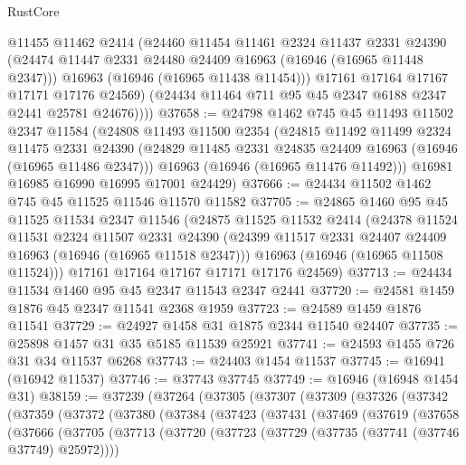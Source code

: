 \begin{lexlean}{RustCore}
\begin{coremodule}
            @11455
            @11462
            @2414
            (@24460
              @11454
              @11461
              @2324
              @11437
              @2331
              @24390
              (@24474 @11447 @2331 @24480 @24409 @16963 (@16946 (@16965 @11448 @2347)))
              @16963
              (@16946 (@16965 @11438 @11454)))
            @17161
            @17164
            @17167
            @17171
            @17176
            @24569)
          (@24434 @11464 @711 @95 @45 @2347 @6188 @2347 @2441 @25781 @24676))))
@37658 := @24798
    @1462
    @745
    @45
    @11493
    @11502
    @2347
    @11584
    (@24808
      @11493
      @11500
      @2354
      (@24815
        @11492
        @11499
        @2324
        @11475
        @2331
        @24390
        (@24829 @11485 @2331 @24835 @24409 @16963 (@16946 (@16965 @11486 @2347)))
        @16963
        (@16946 (@16965 @11476 @11492)))
      @16981
      @16985
      @16990
      @16995
      @17001
      @24429)
@37666 := @24434 @11502 @1462 @745 @45 @11525 @11546 @11570 @11582
@37705 := @24865
    @1460
    @95
    @45
    @11525
    @11534
    @2347
    @11546
    (@24875
      @11525
      @11532
      @2414
      (@24378
        @11524
        @11531
        @2324
        @11507
        @2331
        @24390
        (@24399 @11517 @2331 @24407 @24409 @16963 (@16946 (@16965 @11518 @2347)))
        @16963
        (@16946 (@16965 @11508 @11524)))
      @17161
      @17164
      @17167
      @17171
      @17176
      @24569)
@37713 := @24434 @11534 @1460 @95 @45 @2347 @11543 @2347 @2441
@37720 := @24581 @1459 @1876 @45 @2347 @11541 @2368 @1959
@37723 := @24589 @1459 @1876 @11541
@37729 := @24927 @1458 @31 @1875 @2344 @11540 @24407
@37735 := @25898 @1457 @31 @35 @5185 @11539 @25921
@37741 := @24593 @1455 @726 @31 @34 @11537 @6268
@37743 := @24403 @1454 @11537
@37745 := @16941 (@16942 @11537)
@37746 := @37743 @37745
@37749 := @16946 (@16948 @1454 @31)
@38159 := @37239
    (@37264
      (@37305
        (@37307
          (@37309
            (@37326
              (@37342
                (@37359
                  (@37372
                    (@37380
                      (@37384
                        (@37423
                          (@37431
                            (@37469
                              (@37619
                                (@37658
                                  (@37666
                                    (@37705
                                      (@37713
                                        (@37720
                                          (@37723 (@37729 (@37735 (@37741 (@37746 @37749) @25972))))

\end{coremodule}
\end{lexlean}

